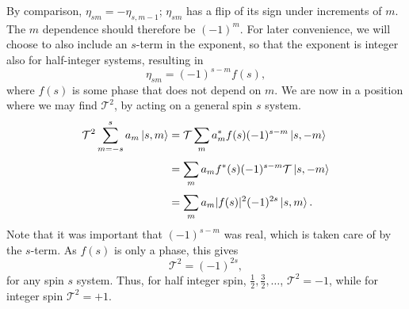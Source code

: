 By comparison, $\eta _{sm}= - \eta _{s, m-1}$; $\eta _{sm}$ has a flip of its sign under increments of $m$.
The $m$ dependence should therefore be $(-1)^m$.
For later convenience, we will choose to also include an $s$-term in the exponent, so that the exponent is integer also for half-integer systems, resulting in
\begin{equation}
  \eta _{sm} = (-1)^{s-m} f(s),
\end{equation}
where  $f(s)$  is some phase that does not depend on $m$.
We are now in a position where we may find $\mathcal{T} ^2$, by acting on a general spin $s$ system.
\begin{equation}
  \begin{split}
  \mathcal{T} ^2 \sum\limits_{m = -s}^s a_m \ket{s, m} &= \mathcal{T}  \sum\limits_m^{} a^{*}_m f(s) (-1)^{s-m} \ket{s, -m}\\
                                                  &= \sum\limits_m^{} a_m f^{*}(s) (-1)^{s-m} \mathcal{T} \ket{s, -m}\\
  &= \sum\limits_m^{} a_m |f(s)|^2 (-1)^{2s} \ket{s, m}.
  \end{split}
\end{equation}
Note that it was important that $(-1)^{s-m}$ was real, which is taken care of by the $s$-term.
As $f(s)$ is only a phase, this gives
\begin{equation}
  \mathcal{T} ^2 = (-1)^{2s},
\end{equation}
for any spin $s$ system.
Thus, for half integer spin, $\frac{1}{2}, \frac{3}{2}, \dots $, $\mathcal{T} ^2 = -1$, while for integer spin $\mathcal{T} ^2= +1$.


\begin{comment}
  We implement this by letting the time-reversal operator be a $\pi $ rotation of the spin, around some axis.
  Following the convention of considering this as a rotation around the $y$-axis, the $\mathcal{T} = UK$ operator gets the form~\cite{bernevigTopologicalInsulatorsTopological2013}
  $$
  \mathcal{T} = \eta e^{-i\pi S_y} K,
  $$
  where $\eta$ is some arbitrary phase and $S_y$ is the spin operator in the $y$-direction.
  Also, $\hbar = 1$ for ease of notation.
  Taylor expanding the exponential, splitting the terms into the $\sin$ and $\cos$ terms, and noting that
  \todo{TODO write something more legit here.}
  $$
  S_y^2 = \frac{1}{2}
  $$
  we can simplify the expression for $\mathcal{T}$.
  \begin{equation}
    \mathcal{T} = - i \eta \left(2 S_y\right) K.
  \end{equation}
  Thus, one gets
  \begin{equation}
    \mathcal{T}^2 =
    4 i \eta^2 S_y K i  S_y K =
    4 i \eta^2 S_y (-i S_y^*) =
    4 i \eta^2 S_y S_y^* =
    -4 i \eta^2 S_y^2.
  \end{equation}
\end{comment}
